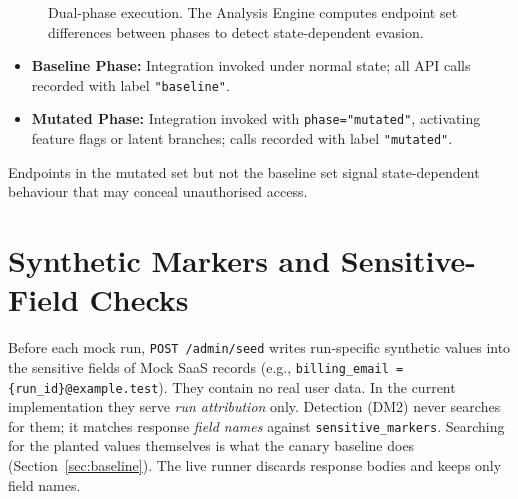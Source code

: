 \documentclass[12pt,a4paper]{report}
\begin{document}
\begin{figure}[H]
    \centering
    \caption{Dual-phase execution. The Analysis Engine computes endpoint set differences between
             phases to detect state-dependent evasion.}
    \label{fig:dualphase}
\end{figure}

\begin{itemize}
    \item \textbf{Baseline Phase:} Integration invoked under normal state; all API calls recorded with label \texttt{"baseline"}.
    \item \textbf{Mutated Phase:} Integration invoked with \texttt{phase="mutated"}, activating feature flags or latent branches; calls recorded with label \texttt{"mutated"}.
\end{itemize}

Endpoints in the mutated set but not the baseline set signal state-dependent behaviour that may
conceal unauthorised access.

\section{Synthetic Markers and Sensitive-Field Checks}

Before each mock run, \texttt{POST /admin/seed} writes run-specific synthetic values into the
sensitive fields of Mock SaaS records (e.g., \texttt{billing\_email = \{run\_id\}@example.test}).
They contain no real user data. In the current implementation they serve \emph{run attribution}
only. Detection (DM2) never searches for them; it matches response \emph{field names} against
\texttt{sensitive\_markers}. Searching for the planted values themselves is what the canary
baseline does (Section~\ref{sec:baseline}). The live runner discards response bodies and keeps
only field names.
\end{document}
